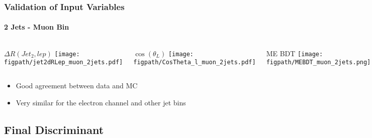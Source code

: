 \begin{frame}
	\frametitle{Validation of Input Variables}
	\framesubtitle{2 Jets - Muon Bin}
	\begin{columns}[T]
			\begin{block}{\scriptsize ${\Delta}R(Jet_{2},lep)$}
				\texttt{[image: \\figpath/jet2dRLep\_muon\_2jets.pdf]}%
			\end{block}
			\begin{block}{\scriptsize $\cos(\theta_{L})$}
				\texttt{[image: \\figpath/CosTheta\_l\_muon\_2jets.pdf]}%
			\end{block}
			\begin{block}{\scriptsize ME BDT}
				\texttt{[image: \\figpath/MEBDT\_muon\_2jets.png]}%
			\end{block}
	\end{columns}
	\begin{block}{}
		\begin{itemize}
			\item Good agreement between data and MC
			\item Very similar for the electron channel and other jet bins
		\end{itemize}
	\end{block}
\end{frame}


\subsection*{Final Discriminant}


